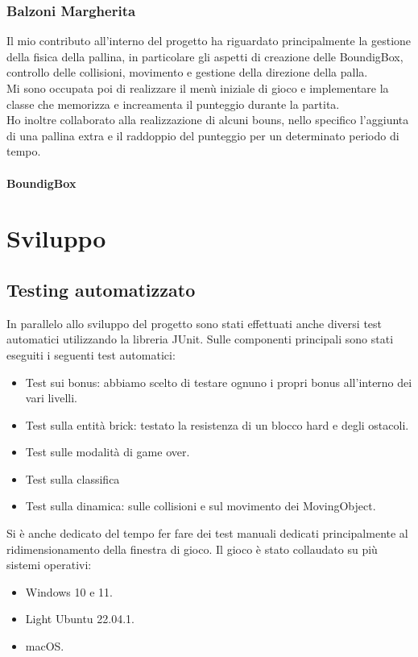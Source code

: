 \documentclass[a4paper,12pt]{report}
\begin{document}
\subsection{Balzoni Margherita}
Il mio contributo all'interno del progetto ha riguardato principalmente la gestione della fisica della pallina, in particolare gli aspetti di creazione delle BoundigBox, controllo delle collisioni, movimento e gestione della direzione della palla.
\\Mi sono occupata poi di realizzare il menù iniziale di gioco e implementare la classe che memorizza e increamenta il punteggio durante la partita.
\\Ho inoltre collaborato alla realizzazione di alcuni bouns, nello specifico l'aggiunta di una pallina extra e il raddoppio del punteggio per un determinato periodo di tempo.\\\\
\textbf{BoundigBox}\\
\pagebreak
\chapter{Sviluppo}
\section{Testing automatizzato}
In parallelo allo sviluppo del progetto sono stati effettuati anche diversi test automatici utilizzando la libreria JUnit.
Sulle componenti principali sono stati eseguiti i seguenti test automatici:
\begin{itemize}
    \item Test sui bonus: abbiamo scelto di testare ognuno i propri bonus all'interno dei vari livelli.
    \item Test sulla entità brick: testato la resistenza di un blocco hard e degli ostacoli.
    \item Test sulle modalità di game over.
    \item Test sulla classifica
    \item Test sulla dinamica: sulle collisioni e sul movimento dei MovingObject.
\end{itemize}
Si è anche dedicato del tempo fer fare dei test manuali dedicati principalmente al ridimensionamento della finestra di gioco.
Il gioco è stato collaudato su più sistemi operativi:
\begin{itemize}
    \item Windows 10 e 11.
    \item Light Ubuntu 22.04.1.
    \item macOS.
\end{itemize}
\end{document}
